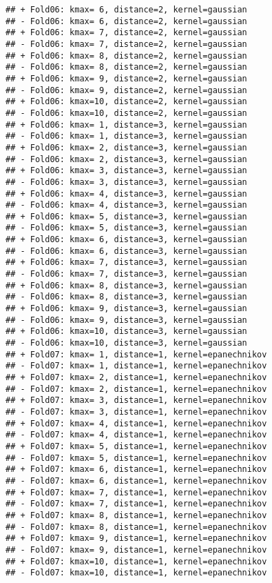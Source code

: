 \documentclass[
]{article}
\begin{document}
\begin{verbatim}
## + Fold06: kmax= 6, distance=2, kernel=gaussian 
## - Fold06: kmax= 6, distance=2, kernel=gaussian 
## + Fold06: kmax= 7, distance=2, kernel=gaussian 
## - Fold06: kmax= 7, distance=2, kernel=gaussian 
## + Fold06: kmax= 8, distance=2, kernel=gaussian 
## - Fold06: kmax= 8, distance=2, kernel=gaussian 
## + Fold06: kmax= 9, distance=2, kernel=gaussian 
## - Fold06: kmax= 9, distance=2, kernel=gaussian 
## + Fold06: kmax=10, distance=2, kernel=gaussian 
## - Fold06: kmax=10, distance=2, kernel=gaussian 
## + Fold06: kmax= 1, distance=3, kernel=gaussian 
## - Fold06: kmax= 1, distance=3, kernel=gaussian 
## + Fold06: kmax= 2, distance=3, kernel=gaussian 
## - Fold06: kmax= 2, distance=3, kernel=gaussian 
## + Fold06: kmax= 3, distance=3, kernel=gaussian 
## - Fold06: kmax= 3, distance=3, kernel=gaussian 
## + Fold06: kmax= 4, distance=3, kernel=gaussian 
## - Fold06: kmax= 4, distance=3, kernel=gaussian 
## + Fold06: kmax= 5, distance=3, kernel=gaussian 
## - Fold06: kmax= 5, distance=3, kernel=gaussian 
## + Fold06: kmax= 6, distance=3, kernel=gaussian 
## - Fold06: kmax= 6, distance=3, kernel=gaussian 
## + Fold06: kmax= 7, distance=3, kernel=gaussian 
## - Fold06: kmax= 7, distance=3, kernel=gaussian 
## + Fold06: kmax= 8, distance=3, kernel=gaussian 
## - Fold06: kmax= 8, distance=3, kernel=gaussian 
## + Fold06: kmax= 9, distance=3, kernel=gaussian 
## - Fold06: kmax= 9, distance=3, kernel=gaussian 
## + Fold06: kmax=10, distance=3, kernel=gaussian 
## - Fold06: kmax=10, distance=3, kernel=gaussian 
## + Fold07: kmax= 1, distance=1, kernel=epanechnikov 
## - Fold07: kmax= 1, distance=1, kernel=epanechnikov 
## + Fold07: kmax= 2, distance=1, kernel=epanechnikov 
## - Fold07: kmax= 2, distance=1, kernel=epanechnikov 
## + Fold07: kmax= 3, distance=1, kernel=epanechnikov 
## - Fold07: kmax= 3, distance=1, kernel=epanechnikov 
## + Fold07: kmax= 4, distance=1, kernel=epanechnikov 
## - Fold07: kmax= 4, distance=1, kernel=epanechnikov 
## + Fold07: kmax= 5, distance=1, kernel=epanechnikov 
## - Fold07: kmax= 5, distance=1, kernel=epanechnikov 
## + Fold07: kmax= 6, distance=1, kernel=epanechnikov 
## - Fold07: kmax= 6, distance=1, kernel=epanechnikov 
## + Fold07: kmax= 7, distance=1, kernel=epanechnikov 
## - Fold07: kmax= 7, distance=1, kernel=epanechnikov 
## + Fold07: kmax= 8, distance=1, kernel=epanechnikov 
## - Fold07: kmax= 8, distance=1, kernel=epanechnikov 
## + Fold07: kmax= 9, distance=1, kernel=epanechnikov 
## - Fold07: kmax= 9, distance=1, kernel=epanechnikov 
## + Fold07: kmax=10, distance=1, kernel=epanechnikov 
## - Fold07: kmax=10, distance=1, kernel=epanechnikov 

\end{verbatim}
\end{document}
